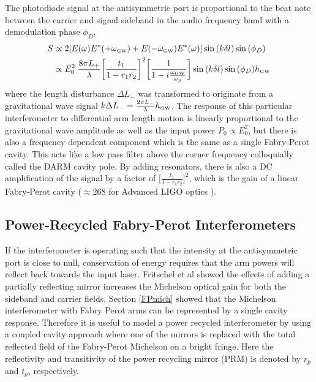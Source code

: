 		The photodiode signal at the antisymmetric port is proportional to the beat note between the carrier and signal sideband in the audio frequency band with a demodulation phase $\phi_{D}$,
		\begin{equation}
		\begin{aligned}
			S &\propto 2 [E(\omega) E^*(+\omega_{\text{\tiny GW}}) +  E(-\omega_{\text{\tiny GW}}) E^*(\omega) ] \sin{(k\delta l)} \sin{(\phi_{D})} \\
			  &\propto E_0^2 \; \frac{8\pi L_+}{\lambda}  \bigg[\frac{t_1}{1-r_1r_2}\bigg]^2 \bigg[\frac{1}{1 - i \frac{\omega_{\text{\tiny GW}}}{\omega_p}}\bigg] \sin{(k\delta l)} \sin{(\phi_{D})} h_{\text{\tiny GW}}
		\end{aligned}
		\end{equation}
		where the length disturbance $\Delta L_{-}$ was transformed to originate from a gravitational wave signal $k \Delta L_{-} = \frac{2\pi L_{-}}{\lambda} h_{\text{\tiny GW}}$.
		The response of this particular interferometer to differential arm length motion is linearly proportional to the gravitational wave amplitude as well as the input power $P_0 \propto E_0^2$, but there is also a frequency dependent component which is the same as a single Fabry-Perot cavity. This acts like a low pass filter above the corner frequency colloquially called the DARM cavity pole.  By adding resonators, there is also a DC amplification of the signal by a factor of $\bigg[\frac{t_1}{1-r_1r_2}\bigg]^2$, which is the gain of a linear Fabry-Perot cavity ($\approx 268$ for Advanced LIGO optics \cite{galaxy}).  

		\subsection{Power-Recycled Fabry-Perot Interferometers}
		If the interferometer is operating such that the intensity at the antisymmetric port is close to null, conservation of energy requires that the arm powers will reflect back towards the input laser.  Fritschel et al \cite{Fritschel_Readout} \cite{FritschelLightRecycling} showed the effects of adding a partially reflecting mirror increases the Michelson optical gain for both the sideband and carrier fields. Section \ref{FPmich} showed that the Michelson interferometer with Fabry Perot arms can be represented by a single cavity response.  Therefore it is useful to model a power recycled interferometer by using a coupled cavity approach where one of the mirrors is replaced with the total reflected field of the Fabry-Perot Michelson on a bright fringe.  Here the reflectivity and transitivity of the power recycling mirror (PRM) is denoted by $r_p$ and $t_p$, respectively.
		
